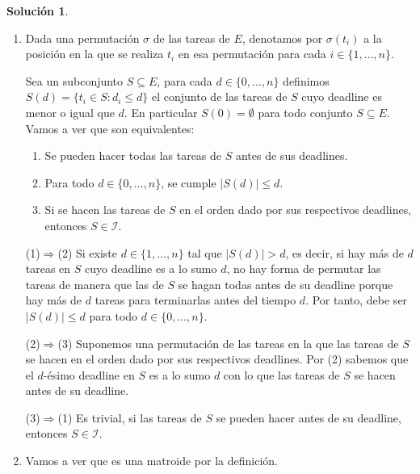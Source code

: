\documentclass[10pt]{article}
\theoremstyle{definition}
\newtheorem*{sol}{Solución}
\begin{document}
\begin{sol}\phantom{}
\begin{enumerate}[labelindent=\parindent, label=(\alph*), ref=\alph*]
\item Dada una permutación $\sigma$ de las tareas de $E$, denotamos por $\sigma(t_i)$ a la posición en la que se realiza $t_i$ en esa permutación para cada $i\in\{1,\ldots, n\}$.

Sea un subconjunto $S\subseteq E$, para cada $d\in\{0,\ldots, n\}$ definimos $S(d)=\{t_i\in S: d_i\leq d\}$ el conjunto de las tareas de $S$ cuyo deadline es menor o igual que $d$. En particular $S(0)=\emptyset$ para todo conjunto $S\subseteq E$. Vamos a ver que son equivalentes:
\begin{enumerate}[label=(\arabic*)]
\item Se pueden hacer todas las tareas de $S$ antes de sus deadlines.
\item Para todo $d\in\{0,\ldots, n\}$, se cumple $|S(d)|\leq d$.
\item Si se hacen las tareas de $S$ en el orden dado por sus respectivos deadlines, entonces $S\in\mathcal{I}$.
\end{enumerate}
(1)$\Longrightarrow$(2) Si existe $d\in\{1,\ldots,n\}$ tal que $|S(d)|>d$, es decir, si hay más de $d$ tareas en $S$ cuyo deadline es a lo sumo $d$, no hay forma de permutar las tareas de manera que las de $S$ se hagan todas antes de su deadline porque hay más de $d$ tareas para terminarlas antes del tiempo $d$. Por tanto, debe ser $|S(d)|\leq d$ para todo $d\in\{0,\ldots, n\}$.

(2)$\Longrightarrow$(3) Suponemos una permutación de las tareas en la que las tareas de $S$ se hacen en el orden dado por sus respectivos deadlines. Por (2) sabemos que el $d$-ésimo deadline  en $S$ es a lo sumo $d$ con lo que las tareas de $S$ se hacen antes de su deadline.

(3)$\Longrightarrow$(1) Es trivial, si las tareas de $S$ se pueden hacer antes de su deadline, entonces $S\in\mathcal{I}$.
\item Vamos a ver que es una matroide por la definición.


\end{enumerate}
\end{sol}
\end{document}

